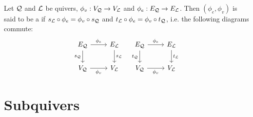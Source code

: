 \documentclass{book}
\begin{document}
	\begin{defn}
		Let $\mathcal{Q}$ and $\mathcal{L}$ be quivers, $\phi_v: V_{\mathcal{Q}} \rightarrow V_{\mathcal{L}}$ and $\phi_e: E_{\mathcal{Q}} \rightarrow E_{\mathcal{L}}$. Then $(\phi_e, \phi_v)$ is said to be a  if $s_{\mathcal{L}} \circ \phi_e = \phi_v \circ s_{\mathcal{Q}}$ and $t_{\mathcal{L}} \circ \phi_e = \phi_v \circ t_{\mathcal{Q}}$, i.e. the following diagrams commute:
		\[ 
		\begin{tikzcd}
			E_{\MQ} \arrow[r, "\phi_e"] \arrow[d, "s_{\MQ}"'] & E_{\ML}  \arrow[d, "s_{\ML}"] \\
			V_{\MQ} \arrow[r, "\phi_v"']                 & V_{\ML}
		\end{tikzcd}
		\quad 
		\begin{tikzcd}
			E_{\MQ} \arrow[r, "\phi_e"] \arrow[d, "t_{\MQ}"'] & E_{\ML}  \arrow[d, "t_{\ML}"] \\
			V_{\MQ} \arrow[r, "\phi_v"']                 & V_{\ML}
		\end{tikzcd}
		\]
	\end{defn}
	
	
	
	
	
	
	
	
	
	
	
	
	
	
	
	
	
	
	
	
	
	
	
	
	
	
	
	
	
	
	
	
	
	
	
	
	
	
	
	
	
	
	
	
	
	
	
	
	
	
	
	
	
	
	
	\section{Subquivers}
	
\end{document}
